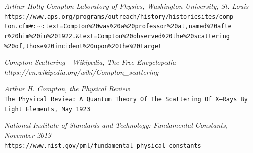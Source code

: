 \documentclass{article}
\begin{document}
\newpage
\begin{thebibliography}{}

\textit{Arthur Holly Compton Laboratory of Physics, Washington University, St. Louis}
\\\texttt{https://www.aps.org/programs/outreach/history/historicsites/comp\\ton.cfm\#:$\sim$:text=Compton\%20was\%20a\%20professor\%20at,named\%20afte\\r\%20him\%20in\%201922.\&text=Compton\%20observed\%20the\%20scattering\\\%20of,those\%20incident\%20upon\%20the\%20target}

\textit{Compton Scattering - Wikipedia, The Free Encyclopedia}
\\\textit{https://en.wikipedia.org/wiki/Compton_scattering}

\textit{Arthur H. Compton, the Physical Review}
\\\texttt{The Physical Review: A Quantum Theory Of The Scattering Of X—Rays By Light Elements, May 1923}

\textit{National Institute of Standards and Technology: Fundamental Constants, November 2019}
\\\texttt{https://www.nist.gov/pml/fundamental-physical-constants}

\end{thebibliography}

\end{document}
